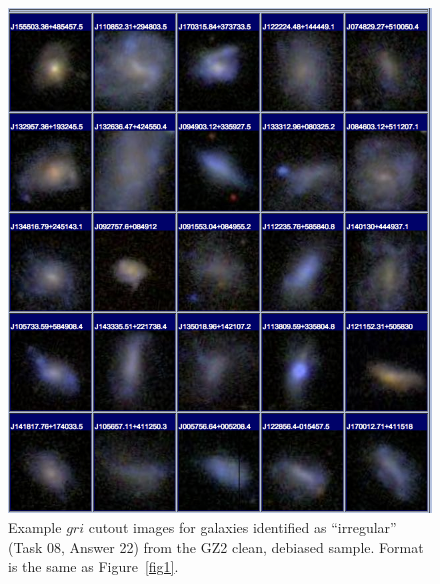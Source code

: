 \documentclass[useAMS,usenatbib]{mn2e}
\begin{document}
\newpage
\clearpage
\begin{figure}
\includegraphics[angle=0,width=7.0in]{figures/gallery/irregular.png}
\caption{Example $gri$ cutout images for galaxies identified as ``irregular'' (Task 08, Answer 22) from the GZ2 clean, debiased sample. Format is the same as Figure~\ref{fig1}.}
\end{figure}
\end{document}
